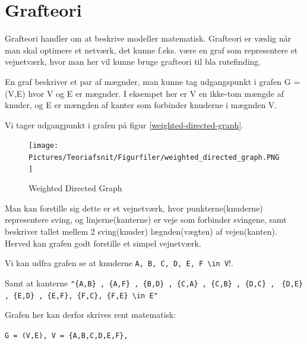 \section{Grafteori}

Grafteori handler om at beskrive  modeller matematisk. Grafteori er væslig når man skal optimere et netværk, det kunne f.eks. være en graf som representere et vejnetværk, hvor man her vil kunne bruge grafteori til bla rutefinding.  

En graf beskriver et par af mægnder, man kunne tag udgangspunkt i grafen G = (V,E) hvor V og E er mægnder. I eksempet her er V en ikke-tom mængde af knuder, og E er mængden af kanter som forbinder knuderne i mægnden V. 

\vspace{5mm}

Vi tager udgangpunkt i grafen på figur \ref{weighted-directed-graph}.

\begin{figure}[H]
\begin{adjustbox}{width=0.5\textwidth,center=\textwidth}
\centering
\texttt{[image: Pictures/Teoriafsnit/Figurfiler/weighted\_directed\_graph.PNG]}
\end{adjustbox}
\caption{Weighted Directed Graph}
\label{fig:weighted-directed-graph}
\end{figure}

\vspace{5mm}

Man kan forstille sig dette er et vejnetværk, hvor punkterne(knuderne) representere sving, og linjerne(kanterne) er veje som forbinder svingene, samt beskriver tallet mellem 2 sving(knuder) lægnden(vægten) af vejen(kanten). Herved kan grafen godt forstille et simpel vejnetværk.

\vspace{5mm}

Vi kan udfra grafen se at knuderne \verb"A, B, C, D, E, F \in V"!. 

\vspace{5mm}

Samt at kanterne \verb!"{A,B} , {A,F} , {B,D} , {C,A} , {C,B} , {D,C} ,!
\verb! {D,E} , {E,D} , {E,F}, {F,C}, {F,E} \in E"!

\vspace{5mm}

Grafen her kan derfor skrives rent matematisk:

\vspace{5mm}

\verb!G = (V,E), V = {A,B,C,D,E,F},! 

